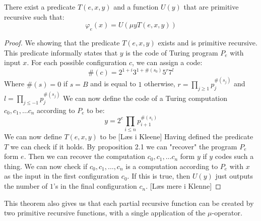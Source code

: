\documentclass[../main.tex]{subfiles}
\begin{document}
\begin{thm}
	\label{thm:Normalform}
	There exist a predicate $T(e,x,y)$ and a function $U(y)$ that are
	primitive recursive such that:
	$$\varphi_e(x)=U(\mu yT(e,x,y))$$
\end{thm}
\begin{proof}
	We showing that the predicate $T(e,x,y)$ exists and is primitive
	recursive. This predicate informally
	states that $y$ is the code of Turing program $P_e$ with input $x$. For
	each possible configuration $c$, we can assign a code:
	$$\#(c)=2^{1+i}3^{1+\#(s_0)}5^r7^l$$
	Where $\#(s)=0$ if $s=B$ and is equal to $1$ otherwise, $r=\prod_{j\geq
	1}p_j^{\#(s_j)}$ and $l=\prod_{j\leq -1}p_j^{\#(s_j)}$
	 We can now define the code of a Turing computation
	$c_0,c_1,\ldots c_n$ according to $P_e$ to be:
	$$y=2^e\prod_{i\leq n}p_{i+1}^{\#(s_i)}$$
	We can now define $T(e,x,y)$ to be [Læs i Kleene]
	Having defined the predicate $T$ we can check if it holds. By
	proposition 2.1 we can "recover" the program $P_e$ form $e$. Then we
	can recover the computation $c_0,c_1,\ldots c_n$ form $y$ if $y$ codes
	such a thing. We can now check if $c_0,c_1,\ldots,c_n$ is a computation
	according to $P_e$ with $x$ as the input in the first configuration
	$c_0$. If this is true, then $U(y)$ just outputs the number of $1$'s in
	the final configuration $c_n$. [Læs mere i Klenne]
\end{proof}
This theorem also gives us that each partial recursive function can be created
by two primitive recursive functions, with a single application of the
$\mu$-operator.
\end{document}
